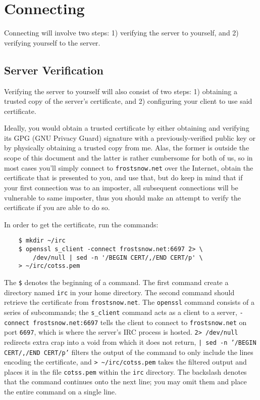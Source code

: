 \documentclass{article}
\begin{document}
\section{Connecting}
Connecting will involve two steps: 1) verifying the server to yourself, and 2) verifying yourself to the server.
\subsection{Server Verification}
Verifying the server to yourself will also consist of two steps: 1) obtaining a trusted copy of the server's certificate, and 2) configuring your client to use said certificate.

Ideally, you would obtain a trusted certificate by either obtaining and verifying its GPG (GNU Privacy Guard) signature with a previously-verified public key or by physically obtaining a trusted copy from me.  Alas, the former is outside the scope of this document and the latter is rather cumbersome for both of us, so in most cases you'll simply connect to \texttt{frostsnow.net} over the Internet, obtain the certificate that is presented to you, and use that, but do keep in mind that if your first connection was to an imposter, all subsequent connections will be vulnerable to same imposter, thus you should make an attempt to verify the certificate if you are able to do so.

In order to get the certificate, run the commands:
\begin{lstlisting}
    $ mkdir ~/irc
    $ openssl s_client -connect frostsnow.net:6697 2> \
        /dev/null | sed -n '/BEGIN CERT/,/END CERT/p' \
	> ~/irc/cotss.pem
\end{lstlisting}
The \texttt{\$} denotes the beginning of a command.  The first command create a directory named \texttt{irc} in your home directory.  The second command should retrieve the certificate from \texttt{frostsnow.net}.  The \texttt{openssl} command consists of a series of subcommands; the \texttt{s\_client} command acts as a client to a server, \texttt{-connect frostsnow.net:6697} tells the client to connect to \texttt{frostsnow.net} on port \texttt{6697}, which is where the server's IRC process is hosted.  \texttt{2> /dev/null} redirects extra crap into a void from which it does not return, \texttt{| sed -n '/BEGIN CERT/,/END CERT/p'} filters the output of the command to only include the lines encoding the certificate, and \texttt{> \textasciitilde/irc/cotss.pem} takes the filtered output and places it in the file \texttt{cotss.pem} within the \texttt{irc} directory.  The backslash denotes that the command continues onto the next line; you may omit them and place the entire command on a single line.
\end{document}
